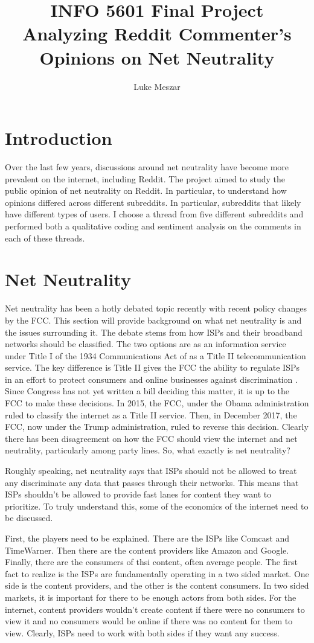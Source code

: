 \documentclass[11pt]{article}
\title{INFO 5601 Final Project \\ Analyzing Reddit Commenter's Opinions on Net Neutrality}
\author{Luke Meszar}
\date{}
\begin{document}
	\maketitle
	\section{Introduction}\label{sec:intro}
	Over the last few years, discussions around net neutrality have become more prevalent on the internet, including Reddit. The project aimed to study the public opinion of net neutrality on Reddit. In particular, to understand how opinions differed across different subreddits. In particular, subreddits that likely have different types of users. I choose a thread from five different subreddits and performed both a qualitative coding and sentiment analysis on the comments in each of these threads.
	\section{Net Neutrality}\label{sec:nn}
	Net neutrality has been a hotly debated topic recently with recent policy changes by the FCC. This section will provide background on what net neutrality is and the issues surrounding it. The debate stems from how ISPs and their broadband networks should be classified. The two options are as an information service under Title I of the 1934 Communications Act of as a Title II telecommunication service. The key difference is Title II gives the FCC the ability to regulate ISPs in an effort to protect consumers and online businesses against discrimination \cite{hanna2018net}. Since Congress has not yet written a bill deciding this matter, it is up to the FCC to make these decisions. In 2015, the FCC, under the Obama administration ruled to classify the internet as a Title II service. Then, in December 2017, the FCC, now under the Trump administration, ruled to reverse this decision. Clearly there has been disagreement on how the FCC should view the internet and net neutrality, particularly among party lines. So, what exactly is net neutrality?
	
	Roughly speaking, net neutrality says that ISPs should not be allowed to treat any discriminate any data that passes through their networks. This means that ISPs shouldn't be allowed to provide fast lanes for content they want to prioritize. To truly understand this, some of the economics of the internet need to be discussed. 
	
	First, the players need to be explained. There are the ISPs like Comcast and TimeWarner. Then there are the content providers like Amazon and Google. Finally, there are the consumers of thsi content, often average people. The first fact to realize is the ISPs are fundamentally operating in a two sided market. One side is the content providers, and the other is the content consumers. In two sided markets, it is important for there to be enough actors from both sides. For the internet, content providers wouldn't create content if there were no consumers to view it and no consumers would be online if there was no content for them to view. Clearly, ISPs need to work with both sides if they want any success. 
	
\end{document}

